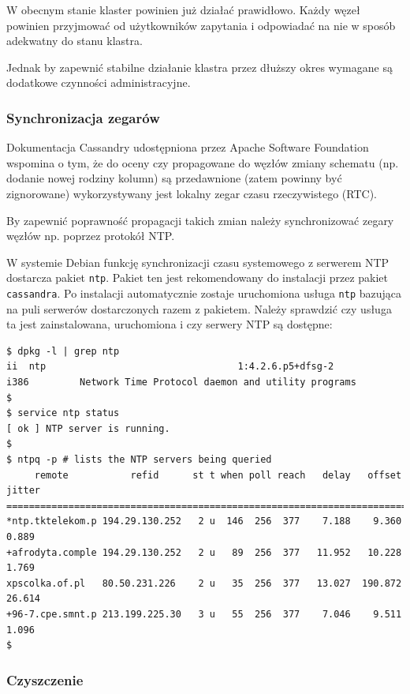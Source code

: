 \documentclass{article} %
\begin{document}
W obecnym stanie klaster powinien już działać prawidłowo.
Każdy węzeł powinien przyjmować od użytkowników zapytania i odpowiadać na nie w sposób adekwatny do stanu klastra.

Jednak by zapewnić stabilne działanie klastra przez dłuższy okres wymagane są dodatkowe czynności administracyjne.

\subsubsection{Synchronizacja zegarów}

Dokumentacja Cassandry udostępniona przez Apache Software Foundation wspomina o tym, że do oceny czy propagowane do węzłów zmiany schematu (np. dodanie nowej rodziny kolumn) są przedawnione (zatem powinny być zignorowane) wykorzystywany jest lokalny zegar czasu rzeczywistego (RTC).

By zapewnić poprawność propagacji takich zmian należy synchronizować zegary węzłów np. poprzez protokół NTP.

W systemie Debian funkcję synchronizacji czasu systemowego z serwerem NTP dostarcza pakiet \texttt{ntp}. Pakiet ten jest rekomendowany do instalacji przez pakiet \texttt{cassandra}. Po instalacji automatycznie zostaje uruchomiona usługa \texttt{ntp} bazująca na puli serwerów dostarczonych razem z pakietem. Należy sprawdzić czy usługa ta jest zainstalowana, uruchomiona i czy serwery NTP są dostępne:

\begin{lstlisting}[style=bash, caption={weryfikacja poprawności działania klienta NTP}]
$ dpkg -l | grep ntp
ii  ntp                                  1:4.2.6.p5+dfsg-2             i386         Network Time Protocol daemon and utility programs
$
$ service ntp status
[ ok ] NTP server is running.
$
$ ntpq -p # lists the NTP servers being queried
     remote           refid      st t when poll reach   delay   offset  jitter
==============================================================================
*ntp.tktelekom.p 194.29.130.252   2 u  146  256  377    7.188    9.360   0.889
+afrodyta.comple 194.29.130.252   2 u   89  256  377   11.952   10.228   1.769
xpscolka.of.pl   80.50.231.226    2 u   35  256  377   13.027  190.872  26.614
+96-7.cpe.smnt.p 213.199.225.30   3 u   55  256  377    7.046    9.511   1.096
$
\end{lstlisting}

\subsubsection{Czyszczenie}
\end{document}
